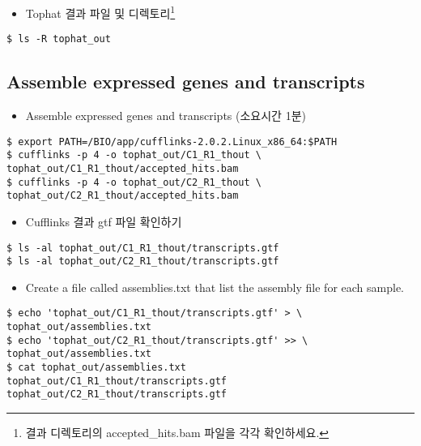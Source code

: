 \documentclass{article}
\begin{document}
\begin{itemize}
\item
  \begin{itemize}
  Tophat 결과 파일 및 디렉토리\footnote{결과 디렉토리의 accepted\_hits.bam 파일을 각각 확인하세요.}
  \end{itemize}
\end{itemize}
\begin{lstlisting}[frame=single,style=Bash,xleftmargin=1.4cm,xrightmargin=1.4cm]
$ ls -R tophat_out
\end{lstlisting}

\subsection{Assemble expressed genes and transcripts}
\begin{itemize}
\item
  \begin{itemize}
  Assemble expressed genes and transcripts (소요시간 1분)  
  \end{itemize}
\end{itemize}
\begin{lstlisting}[frame=single,style=Bash,xleftmargin=1.4cm,xrightmargin=1.4cm]
$ export PATH=/BIO/app/cufflinks-2.0.2.Linux_x86_64:$PATH
$ cufflinks -p 4 -o tophat_out/C1_R1_thout \
tophat_out/C1_R1_thout/accepted_hits.bam
$ cufflinks -p 4 -o tophat_out/C2_R1_thout \
tophat_out/C2_R1_thout/accepted_hits.bam
\end{lstlisting}

\begin{itemize}
\item
  \begin{itemize}
  Cufflinks 결과 gtf 파일 확인하기  
  \end{itemize}
\end{itemize}
\begin{lstlisting}[frame=single,style=Bash,xleftmargin=1.4cm,xrightmargin=1.4cm]
$ ls -al tophat_out/C1_R1_thout/transcripts.gtf 
$ ls -al tophat_out/C2_R1_thout/transcripts.gtf 
\end{lstlisting}

\begin{itemize}
\item
  \begin{itemize}
  Create a file called assemblies.txt that list the assembly file for each sample.  
  \end{itemize}
\end{itemize}
\begin{lstlisting}[frame=single,style=Bash,xleftmargin=1.4cm,xrightmargin=1.4cm]
$ echo 'tophat_out/C1_R1_thout/transcripts.gtf' > \
tophat_out/assemblies.txt
$ echo 'tophat_out/C2_R1_thout/transcripts.gtf' >> \
tophat_out/assemblies.txt
$ cat tophat_out/assemblies.txt 
tophat_out/C1_R1_thout/transcripts.gtf
tophat_out/C2_R1_thout/transcripts.gtf
\end{lstlisting}
\end{document}
